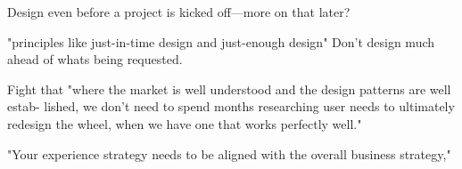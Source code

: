 Design even before a project is kicked off—more on that later?

"principles like just-in-time design and just-enough design" Don't design much ahead of whats being requested. \citep{ratcliffe2011agile:50}

Fight that "where the market is well understood and the design patterns are well estab- lished, we don’t need to spend months researching user needs to ultimately redesign the wheel, when we have one that works perfectly well." 
\citep{ratcliffe2011agile:51}

"Your experience strategy needs to be aligned with the overall business strategy," \citep{ratcliffe2011agile:53}



\citep{ratcliffe2011agile}